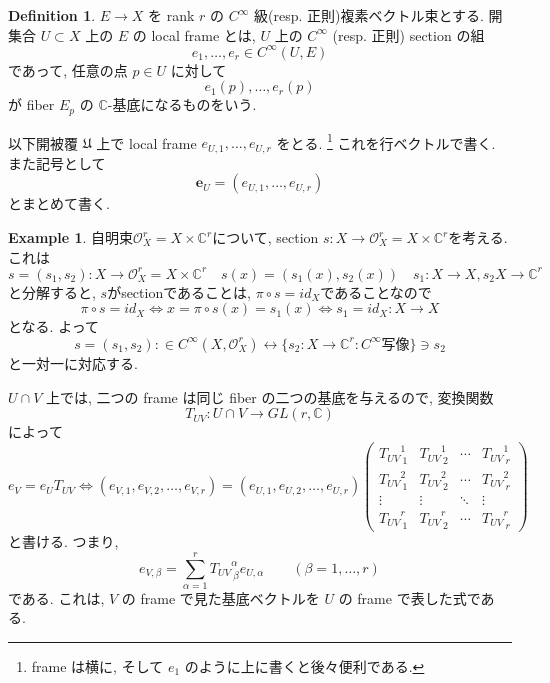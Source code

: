 \documentclass[dvipdfmx,a4paper,11pt]{article} %
\theoremstyle{definition}
\newtheorem{defn}[thm]{Definition}
\newtheorem{ex}[thm]{Example}
\theoremstyle{remark}
\numberwithin{equation}{section}
\newcommand{\C}{\mathbb{C}}
\begin{document}
\begin{defn}
\(E\to X\) を rank \(r\) の \(C^{\infty}\) 級(resp. 正則)複素ベクトル束とする. 開集合 \(U\subset X\) 上の \(E\) の local frame とは, \(U\) 上の \(C^{\infty}\) (resp. 正則) section の組
\[
e_1,\ldots,e_r\in C^\infty(U,E)
\]
であって, 任意の点 \(p\in U\) に対して
\[
e_1(p),\ldots,e_r(p)
\]
が fiber \(E_p\) の \(\mathbb{C}\)-基底になるものをいう. 

以下開被覆 \(\mathfrak{U}\) 上で local frame
\(
e_{U,1},\ldots,e_{U,r}
\)
をとる. \footnote{frame は横に, そして \(e_{1}\) のように上に書くと後々便利である.}
これを行ベクトルで書く. また記号として
\[
\mathbf{e}_U=(e_{U,1},\ldots,e_{U,r})
\]
とまとめて書く. 
\end{defn}

\begin{ex}
自明束$\mathcal{O}_X^{r} = X \times \C^r$について, section 
$s : X \to \mathcal{O}_X^{r} = X \times \C^r$を考える. 
これは
$$
s=(s_1, s_2): X \to \mathcal{O}_X^{r} = X \times \C^r
\quad s(x)=(s_1(x), s_2(x)) \quad 
s_1 : X \to X, s_2 X \to \C^r
$$
と分解すると, $s$がsectionであることは, $\pi \circ s=id_{X}$であることなので
$$
\pi \circ s=id_{X}
\Leftrightarrow 
x=\pi \circ s(x)=s_1(x)
\Leftrightarrow 
s_1=id_X : X \to X
$$
となる. 
よって
$$
s=(s_1, s_2):
\in
C^{\infty}(X, \mathcal{O}_X^{r} )
\leftrightarrow 
\{ s_2 : X \to \C^r : \text{$C^\infty$写像}\} \ni s_2
$$
と一対一に対応する. 

\end{ex}

\(U\cap V\) 上では, 二つの frame は同じ fiber の二つの基底を与えるので, 
変換関数
\[
T_{UV}\colon U\cap V\longrightarrow GL(r,\mathbb{C})
\]
によって
\begin{equation}
\label{eq-glue-condition}
e_V=e_U T_{UV}
\Leftrightarrow 
(e_{V,1},e_{V,2},\ldots,e_{V,r})
=
(e_{U,1}, e_{U,2},\ldots,e_{U,r})
\begin{pmatrix}
{T_{UV}}^{1}_{\ 1} & {T_{UV}}^{1}_{\ 2}& \cdots & {T_{UV}}^{1}_{\ r}\\
{T_{UV}}^{2}_{\ 1} & {T_{UV}}^{2}_{\ 2}& \cdots & {T_{UV}}^{2}_{\ r}\\
\vdots & \vdots & \ddots & \vdots\\
{T_{UV}}^{r}_{\ 1}& {T_{UV}}^{r}_{\ 2}& \cdots & {T_{UV}}^{r}_{\ r}
\end{pmatrix}
\end{equation}
と書ける. つまり,
\[
e_{V,\beta}
=
\sum_{\alpha=1}^r {T_{UV}}^{\alpha}_{\ \beta}e_{U,\alpha}
\qquad
(\beta=1,\ldots,r)
\]
である. これは, \(V\) の frame で見た基底ベクトルを \(U\) の frame で表した式である.
\end{document}

